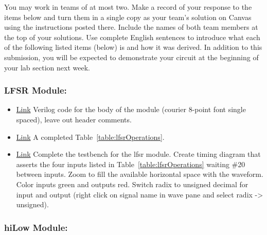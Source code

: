 You may work in teams of at most two. Make a record of your response to
the items below and turn them in a single copy as your team's solution
on Canvas using the instructions posted there. Include the names of both
team members at the top of your solutions. Use complete English
sentences to introduce what each of the following listed items (below)
is and how it was derived. In addition to this submission, you will be
expected to demonstrate your circuit at the beginning of your lab
section next week.

\subsubsection{LFSR Module: }
\begin{itemize}
\item
  \protect\hyperlink{lfsr_verilog}{Link} Verilog code for the body of
  the module (courier 8-point font single spaced), leave out header
  comments.
\item
  \protect\hyperlink{_Ref31885470}{Link} A completed Table~\ref{table:lfsrOperations}.
\item
  \protect\hyperlink{lfsr_testbench}{Link} Complete the testbench for
  the lfsr module. Create timing diagram that asserts the four inputs
  listed in Table~\ref{table:lfsrOperations} waiting \#20 between inputs. Zoom to fill the
  available horizontal space with the waveform. Color inputs green and
  outputs red. Switch radix to unsigned decimal for input and output
  (right click on signal name in wave pane and select radix
  -\textgreater{} unsigned).
\end{itemize}

\subsubsection{hiLow Module: }


